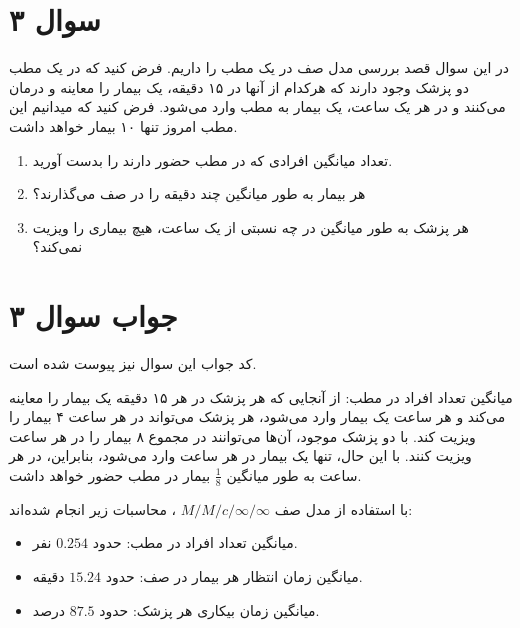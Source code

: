 \section*{سوال ۳}

در این سوال قصد بررسی مدل صف در یک مطب را داریم. فرض کنید که در یک مطب دو پزشک وجود دارند که هرکدام از آنها در ۱۵ دقیقه، یک بیمار را معاینه و درمان می‌کنند و در هر یک ساعت، یک بیمار به مطب وارد می‌شود. فرض کنید که میدانیم این مطب امروز تنها ۱۰ بیمار خواهد داشت.

\begin{enumerate}
	\item تعداد میانگین افرادی که در مطب حضور دارند را بدست آورید.
	\item هر بیمار به طور میانگین چند دقیقه را در صف می‌گذارند؟
	\item هر پزشک به طور میانگین در چه نسبتی از یک ساعت، هیچ بیماری را ویزیت نمی‌کند؟
\end{enumerate}

\section*{جواب سوال ۳}

کد جواب این سوال نیز پیوست شده است.

میانگین تعداد افراد در مطب: از آنجایی که هر پزشک در هر ۱۵ دقیقه یک بیمار را معاینه می‌کند و هر ساعت یک بیمار وارد می‌شود، هر پزشک می‌تواند در هر ساعت ۴ بیمار را ویزیت کند. با دو پزشک موجود، آن‌ها می‌توانند در مجموع ۸ بیمار را در هر ساعت ویزیت کنند. با این حال، تنها یک بیمار در هر ساعت وارد می‌شود، بنابراین، در هر ساعت به طور میانگین \(\frac{1}{8}\) بیمار در مطب حضور خواهد داشت.

با استفاده از مدل صف
$M/M/c/ \infty / \infty$
، محاسبات زیر انجام شده‌اند:

\begin{itemize}
	\item
	میانگین تعداد افراد در مطب: حدود $0.254$ نفر.
	\item
	میانگین زمان انتظار هر بیمار در صف: حدود $15.24$ دقیقه.
	\item 
	میانگین زمان بیکاری هر پزشک: حدود $87.5$ درصد.
\end{itemize}